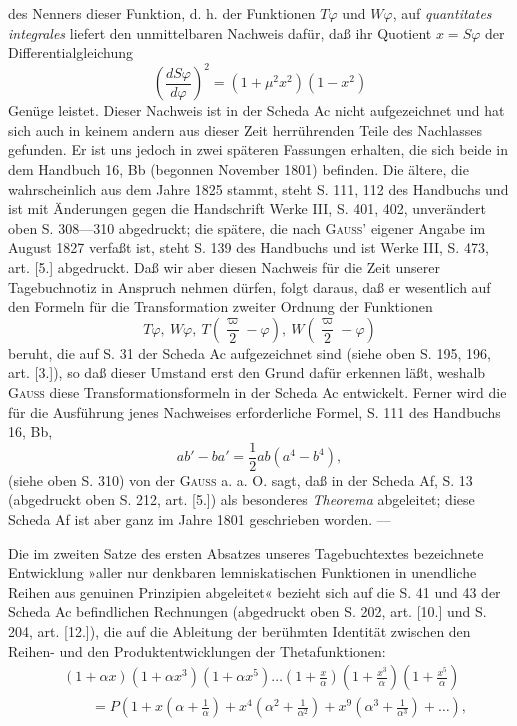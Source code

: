 \clearpage{}
\begingroup\small
\noindent des Nenners dieser Funktion, d. h. der Funktionen \(T\varphi\) und \(W\varphi\), auf \textit{quantitates integrales} liefert den unmittelbaren Nachweis dafür, daß ihr Quotient \(x=S\varphi\) der Differentialgleichung
\[
\left(\frac{dS\varphi}{d\varphi}\right)^2=(1+\mu^2x^2)(1-x^2)
\]
\noindent Genüge leistet. Dieser Nachweis ist in der Scheda Ac nicht aufgezeichnet und hat sich auch in keinem andern aus dieser Zeit herrührenden Teile des Nachlasses gefunden. Er ist uns jedoch in zwei späteren Fassungen erhalten, die sich beide in dem Handbuch 16, Bb (begonnen November 1801) befinden. Die ältere, die wahrscheinlich aus dem Jahre 1825 stammt, steht S. 111, 112 des Handbuchs und ist mit Änderungen gegen die Handschrift Werke III, S. 401, 402, unverändert oben S. 308—310 abgedruckt; die spätere, die nach \textsc{Gauss}’ eigener Angabe im August 1827 verfaßt ist, steht S. 139 des Handbuchs und ist Werke III, S. 473, art. [5.] abgedruckt. Daß wir aber diesen Nachweis für die Zeit unserer Tagebuchnotiz in Anspruch nehmen dürfen, folgt daraus, daß er wesentlich auf den Formeln für die Transformation zweiter Ordnung der Funktionen
\[
T\varphi,\ W\varphi,\ T\left(\frac\varpi2-\varphi\right),\ W\left(\frac\varpi2-\varphi\right)
\]
\noindent beruht, die auf S. 31 der Scheda Ac aufgezeichnet sind (siehe oben S. 195, 196, art. [3.]), so daß dieser Umstand erst den Grund dafür erkennen läßt, weshalb \textsc{Gauss} diese Transformationsformeln in der Scheda Ac entwickelt. Ferner wird die für die Ausführung jenes Nachweises erforderliche Formel, S. 111 des Handbuchs 16, Bb,
\[
ab'-ba'=\frac12ab(a^4-b^4),
\]
\noindent (siehe oben S. 310) von der \textsc{Gauss} a. a. O. sagt, daß  in der Scheda Af, S. 13 (abgedruckt oben S. 212, art. [5.]) als besonderes \textit{Theorema} abgeleitet; diese Scheda Af ist aber ganz im Jahre 1801 geschrieben worden. —
\par\indent Die im zweiten Satze des ersten Absatzes unseres Tagebuchtextes bezeichnete Entwicklung »aller nur denkbaren lemniskatischen Funktionen in unendliche Reihen aus genuinen Prinzipien abgeleitet« bezieht sich auf die S. 41 und 43 der Scheda Ac befindlichen Rechnungen (abgedruckt oben S. 202, art. [10.] und S. 204, art. [12.]), die auf die Ableitung der berühmten Identität zwischen den Reihen- und den Produktentwicklungen der Thetafunktionen:
\[
\begin{aligned}
&(1+\alpha x)(1+\alpha x^3)(1+\alpha x^5)\ldots\left(1+\frac x\alpha\right)\left(1+\frac{x^3}\alpha\right)\left(1+\frac{x^5}\alpha\right)\\
&\qquad=P\left(1+x\left(\alpha+\frac1\alpha\right)+x^4\left(\alpha^2+\frac1{\alpha^2}\right)+x^9\left(\alpha^3+\frac1{\alpha^3}\right)+\ldots\right),
\end{aligned}
\]
